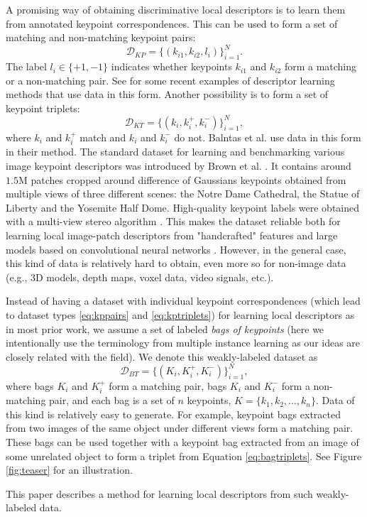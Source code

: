 \documentclass[twocolumn]{article}
\begin{document}
		A promising way of obtaining discriminative local descriptors is to learn them from annotated keypoint correspondences.
		This can be used to form a set of matching and non-matching keypoint pairs:
		\begin{equation}\label{eq:kppairs}
			\mathcal{D}_{KP}=
			\{(k_{i1}, k_{i2}, l_i)\}_{i=1}^N
			.
		\end{equation}
		The label $l_i\in\{+1, -1\}$ indicates whether keypoints $k_{i1}$ and $k_{i2}$ form a matching or a non-matching pair.
		See \cite{brown,binboost,rfd,zagoruyko,matchnet,convdesc} for some recent examples of descriptor learning methods that use data in this form.
		Another possibility is to form a set of keypoint triplets:
		\begin{equation}\label{eq:kptriplets}
			\mathcal{D}_{KT}=
			\{(k_i, k_i^+, k_i^-)\}_{i=1}^N
			,
		\end{equation}
		where $k_i$ and $k_i^+$ match and $k_i$ and $k_i^-$ do not.
		Balntas et al. \cite{pnnet} use data in this form in their method.
		The standard dataset for learning and benchmarking various image keypoint descriptors was introduced by Brown et al. \cite{brown}. %
		It contains around $1.5$M patches cropped around difference of Gaussians keypoints \cite{sift} obtained from multiple views of three different scenes: the Notre Dame Cathedral, the Statue of Liberty and the Yosemite Half Dome.
		High-quality keypoint labels were obtained with a multi-view stereo algorithm \cite{multiviewstereo}.
		This makes the dataset reliable both for learning local image-patch descriptors from "handcrafted" features \cite{cvx,binboost,rfd} and large models based on convolutional neural networks \cite{osendorfer,zagoruyko,matchnet,fracking,convdesc,pnnet}.
		However, in the general case, this kind of data is relatively hard to obtain, even more so for non-image data (e.g., 3D models, depth maps, voxel data, video signals, etc.).

		Instead of having a dataset with individual keypoint correspondences (which lead to dataset types \eqref{eq:kppairs} and \eqref{eq:kptriplets}) for learning local descriptors as in most prior work, we assume a set of labeled \emph{bags of keypoints}
		(here we intentionally use the terminology from multiple instance learning \cite{MIL} as our ideas are closely related with the field).
		We denote this weakly-labeled dataset as
		\begin{equation}\label{eq:bagtriplets}
			\mathcal{D}_{BT}=
			\{(K_{i}, K_i^+, K_i^-)\}_{i=1}^N
			,
		\end{equation}
		where bags $K_i$ and $K_i^+$ form a matching pair, bags $K_i$ and $K_i^-$ form a non-matching pair, and each bag is a set of $n$ keypoints, $K=\{k_1, k_2, \ldots, k_n\}$.
		Data of this kind is relatively easy to generate.
		For example, keypoint bags extracted from two images of the same object under different views form a matching pair.
		These bags can be used together with a keypoint bag extracted from an image of some unrelated object to form a triplet from Equation \eqref{eq:bagtriplets}.
		See Figure \ref{fig:teaser} for an illustration.
		
		This paper describes a method for learning local descriptors from such weakly-labeled data.
\end{document}
